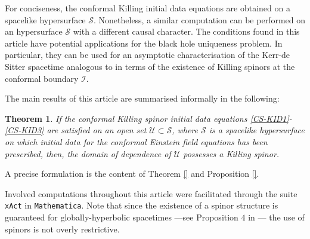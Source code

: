 \documentclass[10pt,a4paper]{article}
\theoremstyle{plain}
\newtheorem*{main}{Theorem}
\begin{document}
\medskip



   For
   conciseness, the conformal Killing initial data equations are
   obtained on a spacelike hypersurface $\mathcal{S}$. Nonetheless, a
   similar computation can be performed on an hypersurface
   $\mathcal{S}$ with a different causal character.  The conditions
   found in this article have potential applications for the black
   hole uniqueness problem.  In particular, they can be used for an
   asymptotic characterisation of the Kerr-de Sitter spacetime analogous to
   \cite{MarPaeSenSim16} in terms of the existence of Killing spinors at
   the conformal boundary $\mathscr{I}$.

\medskip

The main results of this article are summarised  informally
 in the following:


\begin{main}\label{TheoremSummary}
If the conformal Killing spinor initial data equations
 \eqref{CS-KID1}-\eqref{CS-KID3} are satisfied
on an open set $\mathcal{U}\subset \mathcal{S}$, where
 $\mathcal{S}$ is a spacelike hypersurface on which initial data for 
the conformal Einstein field equations has been prescribed,
 then, the domain of dependence of $\mathcal{U}$  possesses a Killing spinor.
\end{main}

 A precise formulation is the content of Theorem
\ref{} and Proposition \ref{}.

\medskip

Involved computations throughout this article were facilitated through
the suite {\tt xAct} in {\tt Mathematica}.
Note that since the existence of a spinor structure is guaranteed for
globally-hyperbolic spacetimes ---see Proposition $4$ in
\cite{CFEbook}--- the use of spinors is not overly restrictive.
\end{document}

